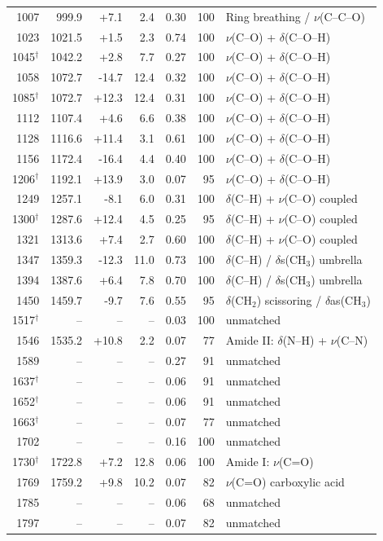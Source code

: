 \documentclass[11pt,a4paper]{article}
\begin{document}
\begin{table}[htbp]
\begin{tabular}{rrrrrrp{4.4cm}}
1007 & 999.9 & +7.1 & 2.4 & 0.30 & 100 & Ring breathing / $\nu$(C--C--O) \\
1023 & 1021.5 & +1.5 & 2.3 & 0.74 & 100 & $\nu$(C--O) + $\delta$(C--O--H) \\
1045$^{\dagger}$ & 1042.2 & +2.8 & 7.7 & 0.27 & 100 & $\nu$(C--O) + $\delta$(C--O--H) \\
1058 & 1072.7 & -14.7 & 12.4 & 0.32 & 100 & $\nu$(C--O) + $\delta$(C--O--H) \\
1085$^{\dagger}$ & 1072.7 & +12.3 & 12.4 & 0.31 & 100 & $\nu$(C--O) + $\delta$(C--O--H) \\
1112 & 1107.4 & +4.6 & 6.6 & 0.38 & 100 & $\nu$(C--O) + $\delta$(C--O--H) \\
1128 & 1116.6 & +11.4 & 3.1 & 0.61 & 100 & $\nu$(C--O) + $\delta$(C--O--H) \\
1156 & 1172.4 & -16.4 & 4.4 & 0.40 & 100 & $\nu$(C--O) + $\delta$(C--O--H) \\
1206$^{\dagger}$ & 1192.1 & +13.9 & 3.0 & 0.07 & 95 & $\nu$(C--O) + $\delta$(C--O--H) \\
1249 & 1257.1 & -8.1 & 6.0 & 0.31 & 100 & $\delta$(C--H) + $\nu$(C--O) coupled \\
1300$^{\dagger}$ & 1287.6 & +12.4 & 4.5 & 0.25 & 95 & $\delta$(C--H) + $\nu$(C--O) coupled \\
1321 & 1313.6 & +7.4 & 2.7 & 0.60 & 100 & $\delta$(C--H) + $\nu$(C--O) coupled \\
1347 & 1359.3 & -12.3 & 11.0 & 0.73 & 100 & $\delta$(C--H) / $\delta$s(CH$_3$) umbrella \\
1394 & 1387.6 & +6.4 & 7.8 & 0.70 & 100 & $\delta$(C--H) / $\delta$s(CH$_3$) umbrella \\
1450 & 1459.7 & -9.7 & 7.6 & 0.55 & 95 & $\delta$(CH$_2$) scissoring / $\delta$as(CH$_3$) \\
1517$^{\dagger}$ & -- & -- & -- & 0.03 & 100 & unmatched \\
1546 & 1535.2 & +10.8 & 2.2 & 0.07 & 77 & Amide II: $\delta$(N--H) + $\nu$(C--N) \\
1589 & -- & -- & -- & 0.27 & 91 & unmatched \\
1637$^{\dagger}$ & -- & -- & -- & 0.06 & 91 & unmatched \\
1652$^{\dagger}$ & -- & -- & -- & 0.06 & 91 & unmatched \\
1663$^{\dagger}$ & -- & -- & -- & 0.07 & 77 & unmatched \\
1702 & -- & -- & -- & 0.16 & 100 & unmatched \\
1730$^{\dagger}$ & 1722.8 & +7.2 & 12.8 & 0.06 & 100 & Amide I: $\nu$(C=O) \\
1769 & 1759.2 & +9.8 & 10.2 & 0.07 & 82 & $\nu$(C=O) carboxylic acid \\
1785 & -- & -- & -- & 0.06 & 68 & unmatched \\
1797 & -- & -- & -- & 0.07 & 82 & unmatched \\
\bottomrule
\end{tabular}
\end{table}
\end{document}
